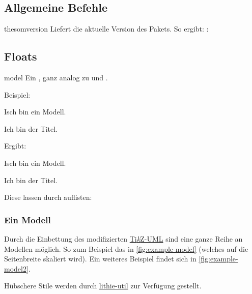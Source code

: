 \documentclass{sopra-base}
\begin{document}
\subsection{Allgemeine Befehle}

\begin{command}{thesomversion}{}
    Liefert die aktuelle Version des Pakets. So ergibt: : \thesomversion\\
\end{command}

\subsection{Floats}

\begin{environment}{model}{}
    Ein , ganz analog zu  und .
\end{environment}

Beispiel:
\begin{plainlatex}[morekeywords={[3]{model}}]
\begin{model}
    \centering
    Isch bin ein Modell.
    \caption[Und ich eigentlich kürzer.]{Ich bin der Titel.}
\end{model}
\end{plainlatex}
Ergibt:
\begin{model}
    \centering
    Isch bin ein Modell.
    \caption[Und ich eigentlich kürzer.]{Ich bin der Titel.}
\end{model}

Diese lassen durch  auflisten:

\listofmodel

\subsubsection{Ein Modell}
Durch die Einbettung des modifizierten \href{https://perso.ensta-paris.fr/~kielbasi/tikzuml/}{Ti\textit{k}Z-UML} sind eine ganze Reihe an Modellen möglich. So zum Beispiel das in \autoref{fig:example-model} (welches auf die Seitenbreite skaliert wird). Ein weiteres Beispiel findet sich in \autoref{fig:example-model2}.

Hübschere Stile werden durch \href{https://github.com/EagleoutIce/lithie-util}{lithie-util} zur Verfügung gestellt.
\end{document}
